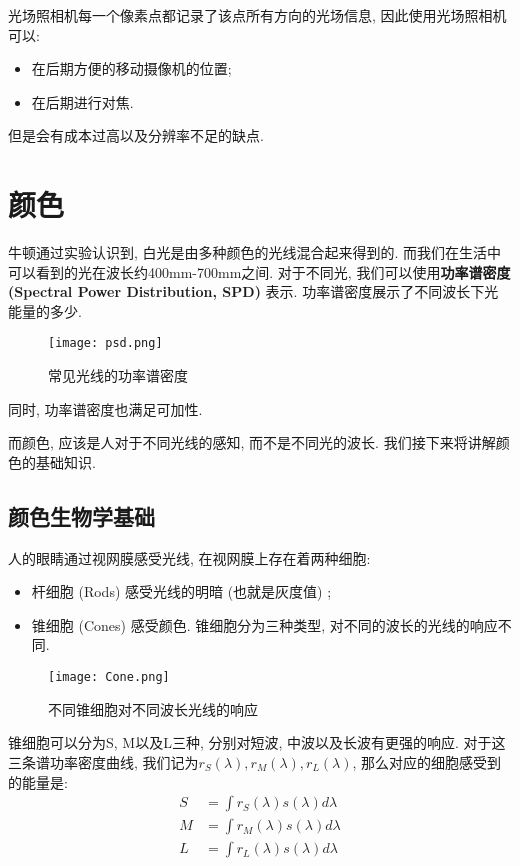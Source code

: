 光场照相机每一个像素点都记录了该点所有方向的光场信息, 因此使用光场照相机可以: 
\begin{itemize}
	\item 在后期方便的移动摄像机的位置; 
	\item 在后期进行对焦. 
\end{itemize}

但是会有成本过高以及分辨率不足的缺点. 

\chapter{颜色}

牛顿通过实验认识到, 白光是由多种颜色的光线混合起来得到的. 而我们在生活中可以看到的光在波长约400mm-700mm之间. 对于不同光, 我们可以使用\textbf{功率谱密度 (Spectral Power Distribution, SPD) }表示. 功率谱密度展示了不同波长下光能量的多少. 

\begin{figure}[H]
	\centering
	\texttt{[image: psd.png]}
	\caption{常见光线的功率谱密度}
	\label{fig:psd}
\end{figure}

同时, 功率谱密度也满足可加性. 

而颜色, 应该是人对于不同光线的感知, 而不是不同光的波长. 我们接下来将讲解颜色的基础知识. 

\section{颜色生物学基础}

人的眼睛通过视网膜感受光线, 在视网膜上存在着两种细胞: 
\begin{itemize}
	\item 杆细胞 (Rods) 感受光线的明暗 (也就是灰度值) ; 
	\item 锥细胞 (Cones) 感受颜色. 锥细胞分为三种类型, 对不同的波长的光线的响应不同. 
\end{itemize}

\begin{figure}[H]
	\centering
	\texttt{[image: Cone.png]}
	\caption{不同锥细胞对不同波长光线的响应}
	\label{fig:Cone}
\end{figure}

锥细胞可以分为S, M以及L三种, 分别对短波, 中波以及长波有更强的响应. 对于这三条谱功率密度曲线, 我们记为$r_S(\lambda),r_M(\lambda),r_L(\lambda)$, 那么对应的细胞感受到的能量是: 
\begin{equation}
	\begin{split}
		S &=\int r_{S}(\lambda) s(\lambda) d \lambda \\
		M &=\int r_{M}(\lambda) s(\lambda) d \lambda \\
		L &=\int r_{L}(\lambda) s(\lambda) d \lambda
	\end{split}
\end{equation}

